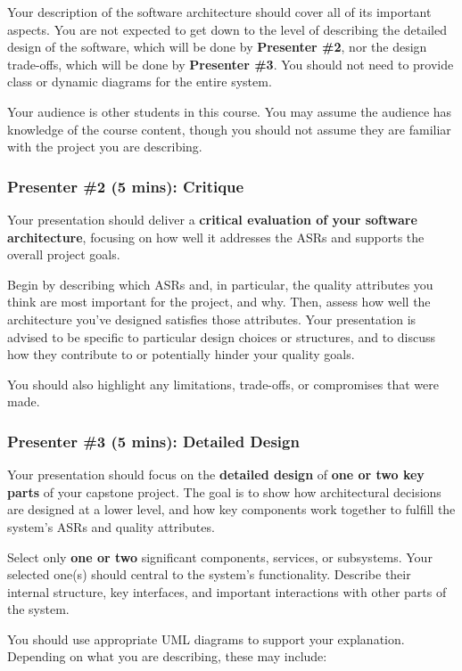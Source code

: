 \documentclass{csse4400}
\begin{document}
Your description of the software architecture should cover all of its important aspects.
You are not expected to get down to the level of describing the detailed design of the software, which will be done by \textbf{Presenter \#2}, nor the design trade-offs, which will be done by \textbf{Presenter \#3}.
You should not need to provide class or dynamic diagrams for the entire system.

Your audience is other students in this course. You may assume the audience has knowledge of the course content,
though you should not assume they are familiar with the project you are describing.


\subsubsection{Presenter \#2 (5 mins): Critique}


Your presentation should deliver a \textbf{critical evaluation of your software architecture}, focusing on how well it addresses the ASRs and supports the overall project goals.

Begin by describing which ASRs and, in particular, the quality attributes you think are most important for the project, and why.
Then, assess how well the architecture you've designed satisfies those attributes.
Your presentation is advised to be specific to particular design choices or structures, and to discuss how they contribute to or potentially hinder your quality goals.

You should also highlight any limitations, trade-offs, or compromises that were made.


\subsubsection{Presenter \#3 (5 mins): Detailed Design}

Your presentation should focus on the \textbf{detailed design} of \textbf{one or two key parts} of your capstone project. The goal is to show how architectural decisions are designed at a lower level, and how key components work together to fulfill the system's ASRs and quality attributes.

Select only \textbf{one or two} significant components, services, or subsystems. Your selected one(s) should central to the system's functionality. Describe their internal structure, key interfaces, and important interactions with other parts of the system.

You should use appropriate UML diagrams to support your explanation. Depending on what you are describing, these may include:
\end{document}

